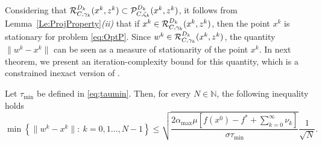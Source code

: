 Considering  that $ {\cal R}_{C,\gamma_k}^{D_k}(x^{k}, z^k) \subset {\cal P}_{C, \zeta_k}^{D_k}(x^{k}, z^k)$, it follows from Lemma~\ref{Le:ProjProperty}{\it (ii)}  that if $x^k \in {\cal R}_{C,\gamma_k}^{D_k}(x^{k}, z^k)$, then the point $x^k$ is stationary for problem \eqref{eq:OptP}. Since $w^k \in {\cal R}_{C,\gamma_k}^{D_k}(x^{k}, z^k)$, the quantity $\|w^k-x^k\|$ can be seen as a measure of stationarity of the point $x^k$. In next theorem, we present an iteration-complexity bound for this quantity,  which is a constrained inexact  version of  \cite[Theorem~1]{GrapigliaSachs2017}.

\begin{theorem} \label{eq:theocomp}
	Let $ \tau_{\min}$ be defined in \eqref{eq;taumin}. Then, for every $N \in \mathbb{N}$, the following inequality holds
	$$
		\min\left\{\|w^k-x^k\| :~ k= 0, 1 \ldots, N-1\right\} \leq \sqrt{\frac{2{\alpha_{\max}}\mu\left[ f(x^0)-f^* +\sum_{k= 0}^{\infty}\nu_k\right] }{\sigma \tau_{\min}}} \frac{1}{\sqrt{N}}.
	$$
\end{theorem}

